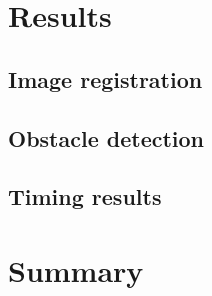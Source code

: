 \section{Results}\label{ch:chapter02_02}
\subsection{Image registration}\label{ch:chapter02_02_01}
\subsection{Obstacle detection}\label{ch:chapter02_02_02}
\subsection{Timing results}\label{ch:chapter02_02_03}
\section{Summary}\label{ch:chapter02_03}
























